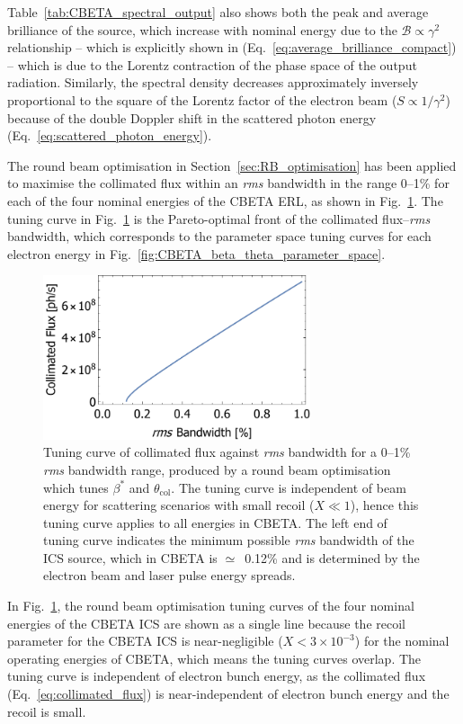\documentclass[../main.tex]{subfiles}
\begin{document}
Table~\ref{tab:CBETA_spectral_output} also shows both the peak and average brilliance of the source, which increase with nominal energy due to the $\mathcal{B} \propto \gamma^{2}$ relationship -- which is explicitly shown in (Eq.~\ref{eq:average_brilliance_compact}) -- which is due to the Lorentz contraction of the phase space of the output radiation.  Similarly, the spectral density decreases approximately inversely proportional to the square of the Lorentz factor of the electron beam ($S \propto 1/\gamma^{2}$) because of the double Doppler shift in the scattered photon energy (Eq.~\ref{eq:scattered_photon_energy}). 

The round beam optimisation in Section~\ref{sec:RB_optimisation} has been applied to maximise the collimated flux within an \textit{rms} bandwidth in the range 0--1\% for each of the four nominal energies of the CBETA ERL, as shown in Fig.~\ref{fig:CBETA_Tuning_Curve}. The tuning curve in Fig.~\ref{fig:CBETA_Tuning_Curve} is the Pareto-optimal front of the collimated flux--\textit{rms} bandwidth, which corresponds to the parameter space tuning curves for each electron energy in Fig.~\ref{fig:CBETA_beta_theta_parameter_space}. 
\begin{figure}[!h]
\centering
\includegraphics[width=0.7\textwidth]{Figures/CBETA_Inverse_Compton_Source_Design/CBETA150_RB_Fcol_BW.pdf}
\caption{Tuning curve of collimated flux against \textit{rms} bandwidth for a 0--1\% \textit{rms} bandwidth range, produced by a round beam optimisation which tunes $\beta^{*}$ and $\theta_{\mathrm{col}}$. The tuning curve is independent of beam energy for scattering scenarios with small recoil ($X \ll 1$), hence this tuning curve applies to all energies in CBETA. The left end of tuning curve indicates the minimum possible \textit{rms} bandwidth of the ICS source, which in CBETA is $\simeq$~0.12\% and is determined by the electron beam and laser pulse energy spreads.}
\label{fig:CBETA_Tuning_Curve}
\end{figure}
In Fig.~\ref{fig:CBETA_Tuning_Curve}, the round beam optimisation tuning curves of the four nominal energies of the CBETA ICS are shown as a single line because the recoil parameter for the CBETA ICS is near-negligible ($X<3\times 10^{-3}$) for the nominal operating energies of CBETA, which means the tuning curves overlap. The tuning curve is independent of electron bunch energy, as the collimated flux (Eq.~\ref{eq:collimated_flux}) is near-independent of electron bunch energy and the recoil is small. 
\end{document}
